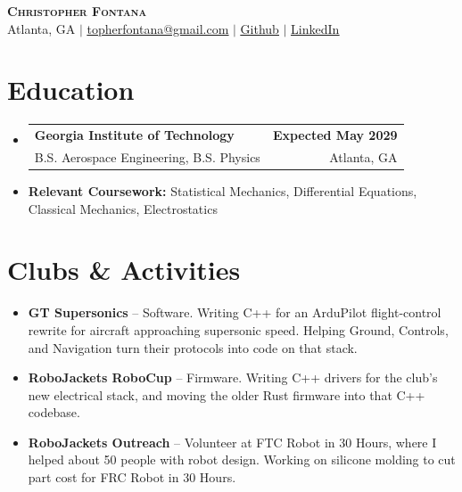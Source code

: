 \documentclass[letterpaper,11pt]{article}
\makeatletter
\newcommand{\resumeItem}[1]{
  \item\small{
    {#1 \vspace{-2pt}}
  }
}
\newcommand{\resumeSubheading}[4]{
  \vspace{-2pt}\item
    \begin{tabular*}{0.97\textwidth}[t]{l@{\extracolsep{\fill}}r}
      \textbf{#1} & \textbf{#2} \\
      {\small#3} & {\small #4} \\
    \end{tabular*}\vspace{-7pt}
}
\newcommand{\resumeSubHeadingListStart}{\begin{itemize}[leftmargin=0.15in, label={}]}
\newcommand{\resumeSubHeadingListEnd}{\end{itemize}}
\makeatother
\begin{document}
\begin{center}
    \textbf{\Huge \scshape Christopher Fontana} \\ \vspace{1pt}
    \small Atlanta, GA
    $|$
    \href{mailto:topherfontana@gmail.com}{\underline{topherfontana@gmail.com}} $|$
    \href{https://github.com/moosecoding}{\underline{Github}} $|$
    \href{https://www.linkedin.com/in/christopher-fontana-469b35359}{\underline{LinkedIn}}
\end{center}


\section{Education}
  \resumeSubHeadingListStart
    \resumeSubheading
      {Georgia Institute of Technology}{Expected May 2029}
      {B.S. Aerospace Engineering, B.S. Physics}{Atlanta, GA}
      \resumeItem{\textbf{Relevant Coursework:} Statistical Mechanics, Differential Equations, Classical Mechanics, Electrostatics}
  \resumeSubHeadingListEnd


\section{Clubs \& Activities}
 \resumeSubHeadingListStart
    \resumeItem{\textbf{GT Supersonics} -- Software. Writing C++ for an ArduPilot flight-control rewrite for aircraft approaching supersonic speed. Helping Ground, Controls, and Navigation turn their protocols into code on that stack.}
    \resumeItem{\textbf{RoboJackets RoboCup} -- Firmware. Writing C++ drivers for the club's new electrical stack, and moving the older Rust firmware into that C++ codebase.}
    \resumeItem{\textbf{RoboJackets Outreach} -- Volunteer at FTC Robot in 30 Hours, where I helped about 50 people with robot design. Working on silicone molding to cut part cost for FRC Robot in 30 Hours.}
 \resumeSubHeadingListEnd


\end{document}
